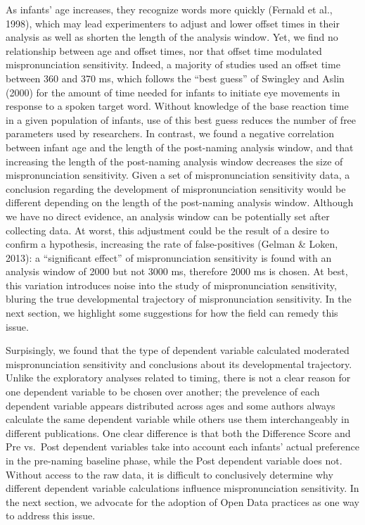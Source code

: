 \documentclass[man]{apa6}
\begin{document}
As infants' age increases, they recognize words more quickly (Fernald et al., 1998), which may lead experimenters to adjust and lower offset times in their analysis as well as shorten the length of the analysis window. Yet, we find no relationship between age and offset times, nor that offset time modulated mispronunciation sensitivity. Indeed, a majority of studies used an offset time between 360 and 370 ms, which follows the \enquote{best guess} of Swingley and Aslin (2000) for the amount of time needed for infants to initiate eye movements in response to a spoken target word. Without knowledge of the base reaction time in a given population of infants, use of this best guess reduces the number of free parameters used by researchers. In contrast, we found a negative correlation between infant age and the length of the post-naming analysis window, and that increasing the length of the post-naming analysis window decreases the size of mispronunciation sensitivity. Given a set of mispronunciation sensitivity data, a conclusion regarding the development of mispronunciation sensitivity would be different depending on the length of the post-naming analysis window. Although we have no direct evidence, an analysis window can be potentially set after collecting data. At worst, this adjustment could be the result of a desire to confirm a hypothesis, increasing the rate of false-positives (Gelman \& Loken, 2013): a \enquote{significant effect} of mispronunciation sensitivity is found with an analysis window of 2000 but not 3000 ms, therefore 2000 ms is chosen. At best, this variation introduces noise into the study of mispronunciation sensitivity, bluring the true developmental trajectory of mispronunciation sensitivity. In the next section, we highlight some suggestions for how the field can remedy this issue.

Surpisingly, we found that the type of dependent variable calculated moderated mispronunciation sensitivity and conclusions about its developmental trajectory. Unlike the exploratory analyses related to timing, there is not a clear reason for one dependent variable to be chosen over another; the prevelence of each dependent variable appears distributed across ages and some authors always calculate the same dependent variable while others use them interchangeably in different publications. One clear difference is that both the Difference Score and Pre vs.~Post dependent variables take into account each infants' actual preference in the pre-naming baseline phase, while the Post dependent variable does not. Without access to the raw data, it is difficult to conclusively determine why different dependent variable calculations influence mispronunciation sensitivity. In the next section, we advocate for the adoption of Open Data practices as one way to address this issue.
\end{document}
